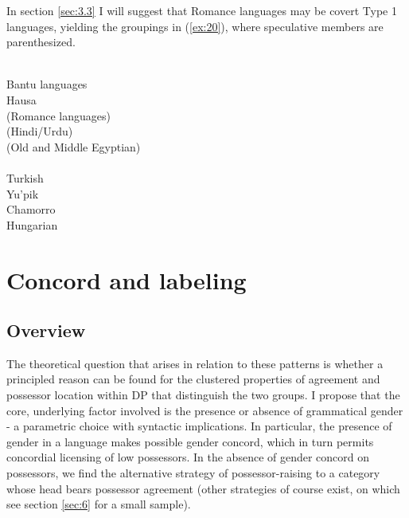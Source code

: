 \documentclass[output=paper
,modfonts
,nonflat]{langsci/langscibook}
\begin{document}
\begin{figure}[!h]
	\begin{exe}
	\end{exe}
\end{figure}
\newpage \noindent In section \ref{sec:3.3} I will suggest that Romance languages may be covert Type 1 languages, yielding the groupings in (\ref{ex:20}), where speculative members are parenthesized.

\begin{exe}
	\ex \label{ex:20}
	\begin{multicols}{2} \raggedcolumns
{}  \\
Bantu languages  \\
Hausa  \\
(Romance languages)  \\
(Hindi/Urdu)  \\
(Old and Middle Egyptian)   
\columnbreak \\
   \\
Turkish\\
Yu'pik\\
Chamorro\\
Hungarian
\end{multicols}
\end{exe}

\section{Concord and labeling} \label{sec:3}
\subsection{Overview} \label{sec:3.1}
The theoretical question that arises in relation to these patterns is whether a principled reason can be found for the clustered properties of agreement and possessor location within DP that distinguish the two groups. I propose that the core, underlying factor involved is the presence or absence of grammatical gender - a parametric choice with syntactic implications. In particular, the presence of gender in a language makes possible gender concord, which in turn permits concordial licensing of low possessors. In the absence of gender concord on possessors, we find the alternative strategy of possessor-raising to a category whose head bears possessor agreement (other strategies of course exist, on which see section \ref{sec:6} for a small sample). 
\end{document}
